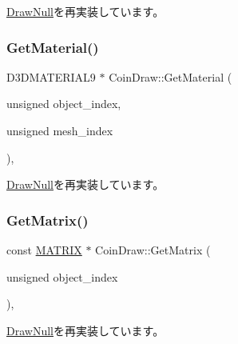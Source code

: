 \mbox{\hyperlink{class_draw_null_a8496ed1b1f765a331a8f1704122b8ca4}{Draw\+Null}}を再実装しています。

\mbox{\label{class_coin_draw_a869a6b7273b273048dd56822fae4d644}} 
\subsubsection{\texorpdfstring{Get\+Material()}{GetMaterial()}}
{\footnotesize\ttfamily D3\+D\+M\+A\+T\+E\+R\+I\+A\+L9 $\ast$ Coin\+Draw\+::\+Get\+Material (\begin{DoxyParamCaption}\item[{unsigned}]{object\+\_\+index,  }\item[{unsigned}]{mesh\+\_\+index }\end{DoxyParamCaption})\hspace{0.3cm}{\ttfamily [override]}, {\ttfamily [virtual]}}



\mbox{\hyperlink{class_draw_null_a84969d22d3436986f214e9896fe44fc6}{Draw\+Null}}を再実装しています。

\mbox{\label{class_coin_draw_a8f5fd8668a4c66fe31446cc6f7c4afd7}} 
\subsubsection{\texorpdfstring{Get\+Matrix()}{GetMatrix()}}
{\footnotesize\ttfamily const \mbox{\hyperlink{_vector3_d_8h_a032295cd9fb1b711757c90667278e744}{M\+A\+T\+R\+IX}} $\ast$ Coin\+Draw\+::\+Get\+Matrix (\begin{DoxyParamCaption}\item[{unsigned}]{object\+\_\+index }\end{DoxyParamCaption})\hspace{0.3cm}{\ttfamily [override]}, {\ttfamily [virtual]}}



\mbox{\hyperlink{class_draw_null_adede079e9c11a756090740b20bb43022}{Draw\+Null}}を再実装しています。

\mbox{\label{class_coin_draw_a178c8d88effe55aaad7d0e45b02e0566}} 
